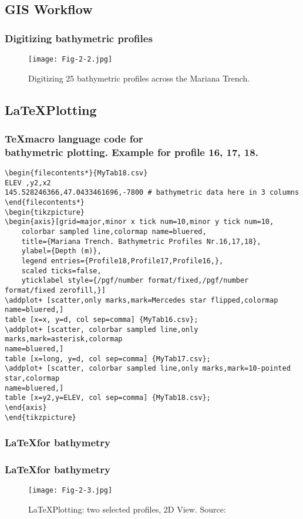 \documentclass[pdflatex,compress,8pt,
	xcolor={dvipsnames,dvipsnames,svgnames,x11names,table},
	hyperref={colorlinks = true,breaklinks = true, urlcolor = NavyBlue, breaklinks = true}]{beamer}
\begin{document}
\subsection{GIS Workflow}
\begin{frame}
\frametitle{Digitizing bathymetric profiles}

\begin{figure}[H]
	\centering
		\texttt{[image: Fig-2-2.jpg]}
	\caption{Digitizing 25 bathymetric profiles across the Mariana Trench. \cite{Lemenkova201991}}\label{fig:2-2}
\end{figure}		
\end{frame}

\subsection{\LaTeX \space Plotting}

\begin{frame}[fragile]\frametitle{\TeX \space macro language code for \\bathymetric plotting. Example for profile 16, 17, 18.}
\begin{Verbatim}[fontsize=\scriptsize]
\begin{filecontents*}{MyTab18.csv}
ELEV ,y2,x2
145.528246366,47.0433461696,-7800 # bathymetric data here in 3 columns 
\end{filecontents*}
\begin{tikzpicture}
\begin{axis}[grid=major,minor x tick num=10,minor y tick num=10,
	colorbar sampled line,colormap name=bluered,
	title={Mariana Trench. Bathymetric Profiles Nr.16,17,18},
	ylabel={Depth (m)},
	legend entries={Profile18,Profile17,Profile16,},
	scaled ticks=false,
	yticklabel style={/pgf/number format/fixed,/pgf/number format/fixed zerofill,}]
\addplot+ [scatter,only marks,mark=Mercedes star flipped,colormap name=bluered,]
table [x=x, y=d, col sep=comma] {MyTab16.csv};
\addplot+ [scatter, colorbar sampled line,only marks,mark=asterisk,colormap
name=bluered,] 
table [x=long, y=d, col sep=comma] {MyTab17.csv};
\addplot+ [scatter, colorbar sampled line,only marks,mark=10-pointed star,colormap
name=bluered,] 
table [x=y2,y=ELEV, col sep=comma] {MyTab18.csv}; 
\end{axis} 
\end{tikzpicture}
\end{Verbatim}
\end{frame}

\begin{frame}\frametitle{\LaTeX \space for bathymetry}
\frametitle{\LaTeX \space for bathymetry}

\begin{figure}[H]
	\centering
		\texttt{[image: Fig-2-3.jpg]}
	\caption{\LaTeX \space Plotting: two selected profiles, 2D View. Source: \cite{Lemenkova201871}}\label{fig:2-3}
\end{figure}		
\end{frame}
\end{document}
